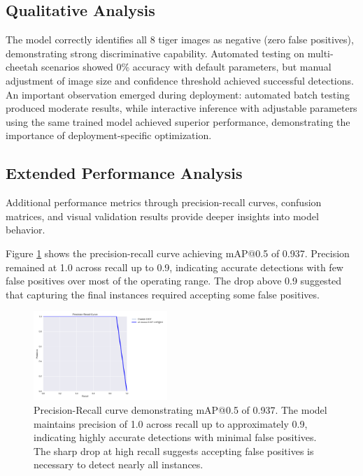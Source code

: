 \documentclass[conference]{IEEEtran}
\begin{document}
\subsection{Qualitative Analysis}

The model correctly identifies all 8 tiger images as negative (zero false positives), demonstrating strong discriminative capability. Automated testing on multi-cheetah scenarios showed 0\% accuracy with default parameters, but manual adjustment of image size and confidence threshold achieved successful detections. An important observation emerged during deployment: automated batch testing produced moderate results, while interactive inference with adjustable parameters using the same trained model achieved superior performance, demonstrating the importance of deployment-specific optimization.

\subsection{Extended Performance Analysis}

Additional performance metrics through precision-recall curves, confusion matrices, and visual validation results provide deeper insights into model behavior.

Figure \ref{fig:pr_curve} shows the precision-recall curve achieving mAP@0.5 of 0.937. Precision remained at 1.0 across recall up to 0.9, indicating accurate detections with few false positives over most of the operating range. The drop above 0.9 suggested that capturing the final instances required accepting some false positives.

\begin{figure}[htbp]
\centerline{\includegraphics[width=0.45\textwidth]{pr_curve.png}}
\caption{Precision-Recall curve demonstrating mAP@0.5 of 0.937. The model maintains precision of 1.0 across recall up to approximately 0.9, indicating highly accurate detections with minimal false positives. The sharp drop at high recall suggests accepting false positives is necessary to detect nearly all instances.}
\label{fig:pr_curve}
\end{figure}
\end{document}
